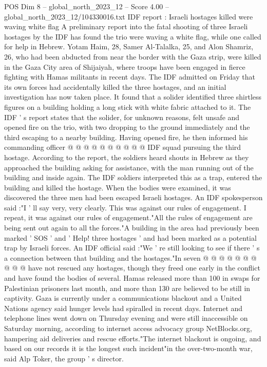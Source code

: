 \begin{textsample}{POS Dim 8 – global\_north\_2023\_12 – Score 4.00 – global\_north\_2023\_12/104330016.txt}  \label{ex:f8_pos_277}
IDF report : Israeli hostages killed were waving white flag A preliminary report into the fatal shooting of three Israeli hostages by the IDF has found the trio were waving a white flag, while one called for help in Hebrew.
Yotam Haim, 28, Samer Al-Talalka, 25, and Alon Shamriz, 26, who had been abducted from near the border with the Gaza strip, were killed in the Gaza City area of Shijaiyah, where troops have been engaged in fierce fighting with Hamas militants in recent days.
The IDF admitted on Friday that its own forces had accidentally killed the three hostages, and an initial investigation has now taken place.
It found that a solider identified three shirtless figures on a building holding a long stick with white fabric attached to it.
The IDF ' s report states that the solider, for unknown reasons, felt unsafe and opened fire on the trio, with two dropping to the ground immediately and the third escaping to a nearby building.
Having opened fire, he then informed his commanding officer @ @ @ @ @ @ @ @ @ @ IDF squad pursuing the third hostage.
According to the report, the soldiers heard shouts in Hebrew as they approached the building asking for assistance, with the man running out of the building and inside again.
The IDF soldiers interpreted this as a trap, entered the building and killed the hostage.
When the bodies were examined, it was discovered the three men had been escaped Israeli hostages.
An IDF spokesperson said :"I ' ll say very, very clearly.
This was against our rules of engagement.
I repeat, it was against our rules of engagement."All the rules of engagement are being sent out again to all the forces."A building in the area had previously been marked ' SOS ' and ' Help! three hostages ' and had been marked as a potential trap by Israeli forces.
An IDF official said :"We ' re still looking to see if there ' s a connection between that building and the hostages."In seven @ @ @ @ @ @ @ @ @ @ have not rescued any hostages, though they freed one early in the conflict and have found the bodies of several.
Hamas released more than 100 in swaps for Palestinian prisoners last month, and more than 130 are believed to be still in captivity.
Gaza is currently under a communications blackout and a United Nations agency said hunger levels had spiralled in recent days.
Internet and telephone lines went down on Thursday evening and were still inaccessible on Saturday morning, according to internet access advocacy group NetBlocks.org, hampering aid deliveries and rescue efforts."The internet blackout is ongoing, and based on our records it is the longest such incident"in the over-two-month war, said Alp Toker, the group ' s director.

\end{textsample}
